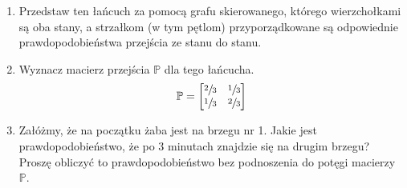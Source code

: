 \begin{enumerate}[label=\alph*)]
\item Przedstaw ten łańcuch za pomocą grafu skierowanego, którego wierzchołkami są oba stany, a strzałkom (w tym pętlom) przyporządkowane są odpowiednie prawdopodobieństwa przejścia ze stanu do stanu.

\begin{figure}[H]
\centering
{}
\end{figure}
\item Wyznacz macierz przejścia $\mathbb{P}$ dla tego łańcucha.
$$\mathbb{P}=\begin{bmatrix}
\sfrac{2}{3}&\sfrac{1}{3}\\
\sfrac{1}{3}&\sfrac{2}{3}
\end{bmatrix}$$
\item Załóżmy, że na początku żaba jest na brzegu nr 1. Jakie jest prawdopodobieństwo, że po 3 minutach znajdzie się na drugim brzegu? Proszę obliczyć to prawdopodobieństwo bez podnoszenia do potęgi macierzy $\mathbb{P}$.


\end{enumerate}
